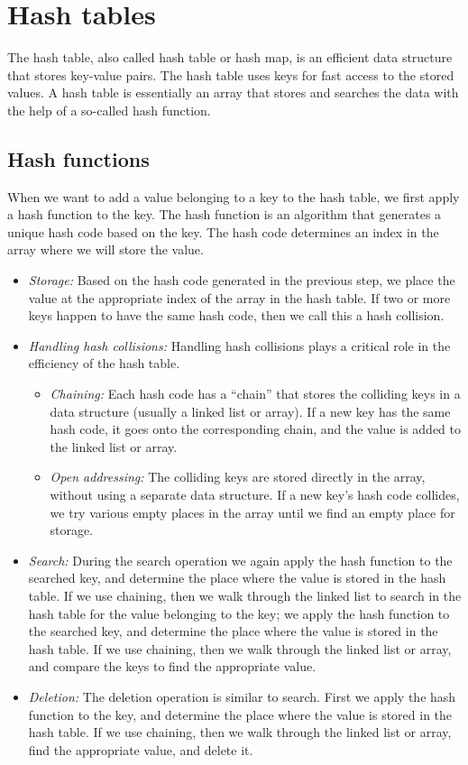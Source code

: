 \documentclass[margin=0px]{article}
\begin{document}
\section{Hash tables}
The hash table, also called hash table or hash map, is an efficient data structure that stores key-value pairs.
The hash table uses keys for fast access to the stored values.
A hash table is essentially an array that stores and searches the data with the help of a so-called hash function.
\subsection{Hash functions}
When we want to add a value belonging to a key to the hash table,
we first apply a hash function to the key. The hash function is an algorithm that generates a unique hash code based on the key.
The hash code determines an index in the array where we will store the value.
\begin{itemize}
    \item \textit{Storage:} Based on the hash code generated in the previous step, we place the value at the appropriate index of the array in the hash table. If two or more keys happen to have the same hash code, then we call this a hash collision.
    \item \textit{Handling hash collisions:} Handling hash collisions plays a critical role in the efficiency of the hash table.
    \begin{itemize}
        \item \textit{Chaining:} Each hash code has a ``chain'' that stores the colliding keys in a data structure (usually a linked list or array). If a new key has the same hash code, it goes onto the corresponding chain, and the value is added to the linked list or array.
        \item \textit{Open addressing:} The colliding keys are stored directly in the array, without using a separate data structure. If a new key's hash code collides, we try various empty places in the array until we find an empty place for storage.
    \end{itemize}
    \item \textit{Search:} During the search operation we again apply the hash function to the searched key, and determine the place where the value is stored in the hash table. If we use chaining, then we walk through the linked list to search in the hash table for the value belonging to the key; we apply the hash function to the searched key, and determine the place where the value is stored in the hash table. If we use chaining, then we walk through the linked list or array, and compare the keys to find the appropriate value.
    \item \textit{Deletion:} The deletion operation is similar to search. First we apply the hash function to the key, and determine the place where the value is stored in the hash table. If we use chaining, then we walk through the linked list or array, find the appropriate value, and delete it.
\end{itemize}
\end{document}
